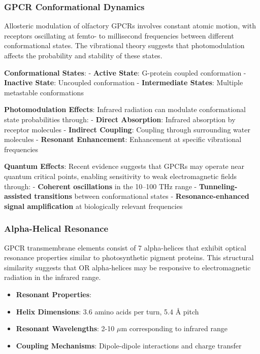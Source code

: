 \documentclass[
  13pt,
  a4paperpaper,
  12pt]{article}
\providecommand{\tightlist}{%
  \setlength{\itemsep}{0pt}\setlength{\parskip}{0pt}}
\begin{document}
\subsubsection{GPCR Conformational
Dynamics}\label{gpcr-conformational-dynamics}

Allosteric modulation of olfactory GPCRs involves constant atomic
motion, with receptors oscillating at femto- to millisecond frequencies
between different conformational states. The vibrational theory suggests
that photomodulation affects the probability and stability of these
states.

\textbf{Conformational States}: - \textbf{Active State}: G-protein
coupled conformation - \textbf{Inactive State}: Uncoupled conformation -
\textbf{Intermediate States}: Multiple metastable conformations

\textbf{Photomodulation Effects}: Infrared radiation can modulate
conformational state probabilities through: - \textbf{Direct
Absorption}: Infrared absorption by receptor molecules -
\textbf{Indirect Coupling}: Coupling through surrounding water molecules
- \textbf{Resonant Enhancement}: Enhancement at specific vibrational
frequencies

\textbf{Quantum Effects}: Recent evidence suggests that GPCRs may
operate near quantum critical points, enabling sensitivity to weak
electromagnetic fields through: - \textbf{Coherent oscillations} in the
10--100 THz range - \textbf{Tunneling-assisted transitions} between
conformational states - \textbf{Resonance-enhanced signal amplification}
at biologically relevant frequencies

\subsubsection{Alpha-Helical Resonance}\label{alpha-helical-resonance}

GPCR transmembrane elements consist of 7 alpha-helices that exhibit
optical resonance properties similar to photosynthetic pigment proteins.
This structural similarity suggests that OR alpha-helices may be
responsive to electromagnetic radiation in the infrared range.

\begin{itemize}
\tightlist
\item
  \textbf{Resonant Properties}:
\item
  \textbf{Helix Dimensions}: 3.6 amino acids per turn, 5.4 \AA{} pitch
\item
  \textbf{Resonant Wavelengths}: 2-10 \(\mu\mathrm{m}\) corresponding to
  infrared range
\item
  \textbf{Coupling Mechanisms}: Dipole-dipole interactions and charge
  transfer
\end{itemize}
\end{document}

